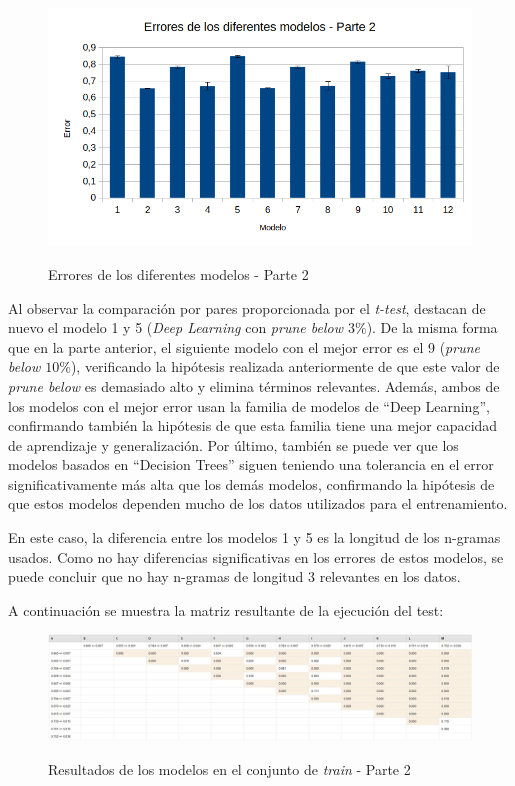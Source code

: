\documentclass[es]{uc3mreport}
\begin{document}
\begin{report}
    \begin{figure}[H]
        \center
        \includegraphics[width=0.85\linewidth]{errors_train2.png}\\
        \caption{Errores de los diferentes modelos - Parte 2}
    \end{figure}

    Al observar la comparación por pares proporcionada por el \textit{t-test},
    destacan de nuevo el modelo 1 y 5 (\textit{Deep Learning}
    con \textit{prune below $3\%$}). De la misma forma que en la parte anterior,
    el siguiente modelo con el mejor error es el 9 (\textit{prune below $10\%$}),
    verificando la hipótesis realizada anteriormente de que este valor de
    \textit{prune below} es demasiado alto y elimina términos relevantes. Además,
    ambos de los modelos con el mejor error usan la familia de modelos de
    ``Deep Learning'', confirmando también la hipótesis de que esta familia tiene
    una mejor capacidad de aprendizaje y generalización. Por último, también se
    puede ver que los modelos basados en ``Decision Trees'' siguen teniendo una
    tolerancia en el error significativamente más alta que los demás modelos,
    confirmando la hipótesis de que estos modelos dependen mucho de los datos
    utilizados para el entrenamiento.

    En este caso, la diferencia entre los modelos 1 y 5 es la longitud de los
    n-gramas usados. Como no hay diferencias significativas en los errores de
    estos modelos, se puede concluir que no hay n-gramas de longitud 3
    relevantes en los datos.

    A continuación se muestra la matriz resultante de la ejecución del test:

    \begin{figure}[H]
        \center
        \includegraphics[width=\linewidth]{t_test2.jpg}\\
        \caption{Resultados de los modelos en el conjunto de \textit{train} - Parte 2}
    \end{figure}


\end{report}
\end{document}
